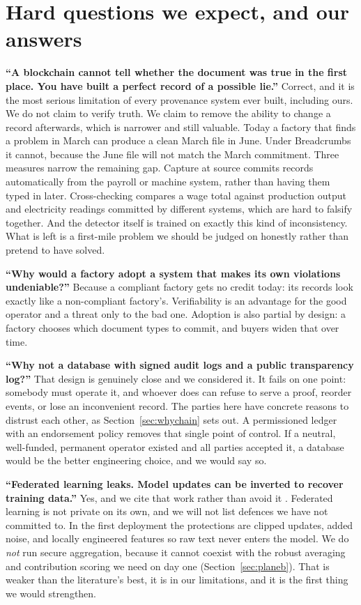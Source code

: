 \documentclass[11pt,a4paper]{article}
\begin{document}
\section{Hard questions we expect, and our answers}
\label{sec:hardquestions}

\textbf{``A blockchain cannot tell whether the document was true in the first
place. You have built a perfect record of a possible lie.''}
Correct, and it is the most serious limitation of every provenance system ever
built, including ours. We do not claim to verify truth. We claim to remove the
ability to change a record afterwards, which is narrower and still valuable.
Today a factory that finds a problem in March can produce a clean March file in
June. Under Breadcrumbs it cannot, because the June file will not match the
March commitment. Three measures narrow the remaining gap. Capture at source
commits records automatically from the payroll or machine system, rather than
having them typed in later. Cross-checking compares a wage total against
production output and electricity readings committed by different systems, which
are hard to falsify together. And the detector itself is trained on exactly this
kind of inconsistency. What is left is a first-mile problem we should be judged on
honestly rather than pretend to have solved.

\textbf{``Why would a factory adopt a system that makes its own violations
undeniable?''}
Because a compliant factory gets no credit today: its records look exactly like
a non-compliant factory's. Verifiability is an advantage for the good operator
and a threat only to the bad one. Adoption is also partial by design: a factory
chooses which document types to commit, and buyers widen that over time.

\textbf{``Why not a database with signed audit logs and a public transparency
log?''}
That design is genuinely close and we considered it. It fails on one point:
somebody must operate it, and whoever does can refuse to serve a proof, reorder
events, or lose an inconvenient record. The parties here have concrete reasons
to distrust each other, as Section~\ref{sec:whychain} sets out. A permissioned ledger with an
endorsement policy removes that single point of control. If a neutral,
well-funded, permanent operator existed and all parties accepted it, a database
would be the better engineering choice, and we would say so.

\textbf{``Federated learning leaks. Model updates can be inverted to recover
training data.''}
Yes, and we cite that work rather than avoid it
\citep{zhu2019dlg,geiping2020inverting}. Federated learning is not private on
its own, and we will not list defences we have not committed to. In the first
deployment the protections are clipped updates, added noise, and locally
engineered features so raw text never enters the model. We do \emph{not} run
secure aggregation, because it cannot coexist with the robust averaging and
contribution scoring we need on day one (Section~\ref{sec:planeb}). That is weaker than the
literature's best, it is in our limitations, and it is the first thing we would
strengthen.
\end{document}

